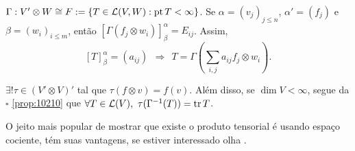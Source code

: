 \begin{note}
    \(\Gamma: V' \otimes W \cong F := \{T \in \mathcal{L}(V,W): \operatorname{pt} T < \infty\}\). Se \(\alpha = (v_j)_{j\leq n}\), \(\alpha' = (f_j)\)  e \(\beta = (w_i)_{i\leq m}\), então \([\Gamma(f_j\otimes w_i)]_\beta^\alpha = E_{ij}\). Assim,  
    \[[T]^\alpha_\beta = (a_{ij}) \ \ \Rightarrow  \ \ T = \Gamma \left(\sum_{i,j} a_{ij} f_j \otimes w_i\right). \]
\end{note}
\vspace{-0.3cm}
\begin{proposition}
    \(\exists ! \tau \in (V'\otimes V)' \) tal que \(\tau (f\otimes v) = f(v)\). Além disso, se \(\dim V < \infty \), segue da \(\square\) \ref{prop:10210} que \(\forall T \in \mathcal{L} (V), \ \tau(\Gamma^{-1}(T)) = \operatorname{tr}T\).  
\end{proposition}


\begin{note}
    O jeito mais popular de mostrar que existe o produto tensorial é usando espaço cociente, tém suas vantagens, se estiver interessado olha \cite[Pág. 347]{MA719}.
\end{note}